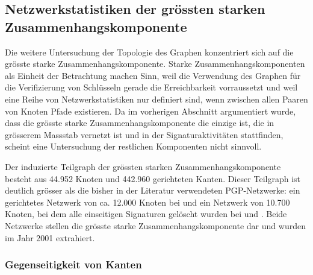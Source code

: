 \subsection{Netzwerkstatistiken der gr\"ossten starken
  Zusammenhangskomponente}
\label{sec:kennz-des-graph}

Die weitere Untersuchung der Topologie des Graphen konzentriert sich
auf die gr\"osste starke Zusammenhangskomponente. Starke
Zusammenhangskomponenten als Einheit der Betrachtung machen Sinn, weil
die Verwendung des Graphen f\"ur die Verifizierung von Schl\"usseln
gerade die Erreichbarkeit vorraussetzt und weil eine Reihe von
Netzwerkstatistiken nur definiert sind, wenn zwischen allen Paaren von
Knoten Pfade existieren. Da im vorherigen Abschnitt argumentiert
wurde, dass die gr\"osste starke Zusammenhangskomponente die einzige
ist, die in gr\"osserem Massstab vernetzt ist und in der
Signaturaktivit\"aten stattfinden, scheint eine Untersuchung der
restlichen Komponenten nicht sinnvoll.

Der induzierte Teilgraph der gr\"ossten starken
Zusammenhangskomponente besteht aus 44.952 Knoten und 442.960
gerichteten Kanten. Dieser Teilgraph ist deutlich gr\"osser als die
bisher in der Literatur verwendeten PGP-Netzwerke:  ein gerichtetes
Netzwerk von ca. 12.000 Knoten bei \cite{Capkun2002} und ein Netzwerk
von 10.700 Knoten, bei dem alle einseitigen Signaturen gel\"oscht
wurden bei \cite{Boguna2004} und \cite{Gregory2010}. Beide Netzwerke
stellen die gr\"osste starke Zusammenhangskomponente dar und wurden im
Jahr 2001 extrahiert.

\subsubsection{Gegenseitigkeit von Kanten}
\label{sec:gegens-von-kant}

